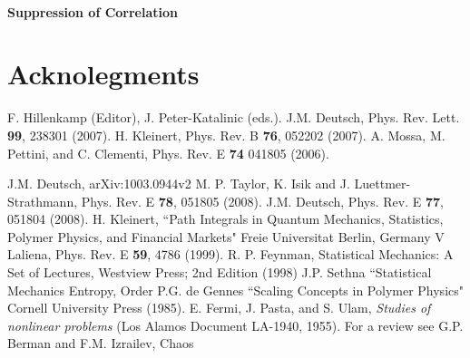 \documentclass[11pt]{ucthesis}
\begin{document}
\subsection{Suppression of Correlation}

\part{Acknolegments}

\begin{thebibliography}{}
 F. Hillenkamp (Editor), J. Peter-Katalinic (eds.). 
 J.M. Deutsch, Phys. Rev. Lett. {\bf 99}, 238301 (2007).
 H. Kleinert, Phys. Rev. B {\bf76}, 052202 (2007). 
 A. Mossa, M. Pettini, and C. Clementi, Phys. Rev. E {\bf 74} 041805 (2006).

 J.M. Deutsch, arXiv:1003.0944v2 
 M. P. Taylor, K. Isik and J. Luettmer-Strathmann,  Phys. Rev. E {\bf 78}, 051805  (2008).
 J.M. Deutsch, Phys. Rev. E {\bf 77}, 051804 (2008).
 H. Kleinert, ``Path Integrals in Quantum Mechanics, Statistics, Polymer Physics, and Financial Markets" Freie Universitat Berlin, Germany
 V Laliena, Phys. Rev. E {\bf 59}, 4786 (1999).
 R. P. Feynman, Statistical Mechanics: A Set of Lectures, Westview Press; 2nd Edition (1998)
 J.P. Sethna ``Statistical Mechanics Entropy, Order
 P.G. de Gennes ``Scaling Concepts in Polymer Physics" Cornell University Press (1985).
 E. Fermi, J. Pasta, and S. Ulam, {\em Studies of nonlinear problems} 
(Los Alamos Document LA-1940, 1955).
 For a review see G.P. Berman and F.M. Izrailev, Chaos





\end{thebibliography}
\end{document}
